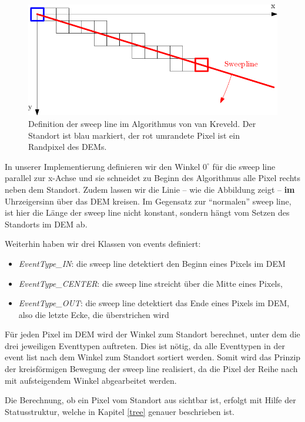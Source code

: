 \begin{figure}[!ht]
 \centering
 \includegraphics[scale=0.45]{bilder/sweep_kreveld}
 \caption{Definition der sweep line im Algorithmus von van Kreveld. Der Standort ist blau markiert, der rot umrandete Pixel ist ein Randpixel des 
 DEMs.}
 \label{sweep_k}
\end{figure}

In unserer Implementierung definieren wir den Winkel $0^\circ$ für die sweep line parallel zur x-Achse und sie schneidet zu Beginn des Algorithmus 
alle Pixel rechts neben dem Standort. Zudem lassen wir die Linie -- wie die Abbildung zeigt -- \textbf{im} Uhrzeigersinn über das DEM kreisen. Im 
Gegensatz zur ``normalen'' sweep line, ist hier die Länge der sweep line nicht konstant, sondern hängt vom Setzen des Standorts im DEM ab. 

Weiterhin haben wir drei Klassen von events definiert: 
\begin{itemize}
 \item \textit{EventType\_IN}: die sweep line detektiert den Beginn eines Pixels im DEM 
 \item \textit{EventType\_CENTER}: die sweep line streicht über die Mitte eines Pixels,
 \item \textit{EventType\_OUT}: die sweep line detektiert das Ende eines Pixels im DEM, also die letzte Ecke, die überstrichen wird
\end{itemize}

Für jeden Pixel im DEM wird der Winkel zum Standort berechnet, unter dem die drei jeweiligen Eventtypen auftreten. Dies ist nötig, da alle Eventtypen 
in der event list nach dem Winkel zum Standort sortiert werden. Somit wird das Prinzip der kreisförmigen Bewegung der sweep line realisiert, da die 
Pixel der Reihe nach mit aufsteigendem Winkel abgearbeitet werden. 

Die Berechnung, ob ein Pixel vom Standort aus sichtbar ist, erfolgt mit Hilfe der Statusstruktur, welche in Kapitel \ref{tree} genauer beschrieben 
ist.

